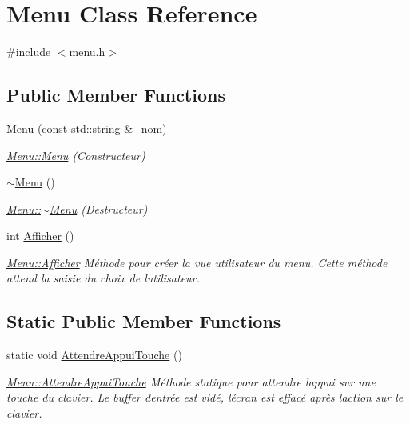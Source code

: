 \hypertarget{class_menu}{}\section{Menu Class Reference}
\label{class_menu}


{\ttfamily \#include $<$menu.\+h$>$}

\subsection*{Public Member Functions}
\begin{DoxyCompactItemize}
\item 
\hyperlink{class_menu_a0540324b94e45b51182db9a30393e27b}{Menu} (const std\+::string \&\+\_\+nom)
\begin{DoxyCompactList}\small\item\em \hyperlink{class_menu_a0540324b94e45b51182db9a30393e27b}{Menu\+::\+Menu} (Constructeur) \end{DoxyCompactList}\item 
\hyperlink{class_menu_a831387f51358cfb88cd018e1777bc980}{$\sim$\+Menu} ()
\begin{DoxyCompactList}\small\item\em \hyperlink{class_menu_a831387f51358cfb88cd018e1777bc980}{Menu\+::$\sim$\+Menu} (Destructeur) \end{DoxyCompactList}\item 
int \hyperlink{class_menu_a079e0c6a24248a07993b48b310ba65ce}{Afficher} ()
\begin{DoxyCompactList}\small\item\em \hyperlink{class_menu_a079e0c6a24248a07993b48b310ba65ce}{Menu\+::\+Afficher} Méthode pour créer la vue utilisateur du menu. Cette méthode attend la saisie du choix de l\textquotesingle{}utilisateur. \end{DoxyCompactList}\end{DoxyCompactItemize}
\subsection*{Static Public Member Functions}
\begin{DoxyCompactItemize}
\item 
static void \hyperlink{class_menu_a6ddcaabf2fedb30f5136f3be655d60ce}{Attendre\+Appui\+Touche} ()
\begin{DoxyCompactList}\small\item\em \hyperlink{class_menu_a6ddcaabf2fedb30f5136f3be655d60ce}{Menu\+::\+Attendre\+Appui\+Touche}  Méthode statique pour attendre l\textquotesingle{}appui sur une touche du clavier. Le buffer d\textquotesingle{}entrée est vidé, l\textquotesingle{}écran est effacé après l\textquotesingle{}action sur le clavier. \end{DoxyCompactList}\end{DoxyCompactItemize}
